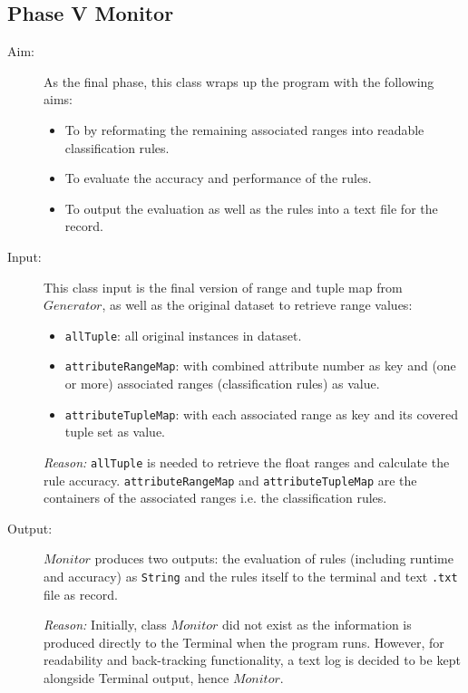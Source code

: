 \begin{description}
\end{description}


\subsection{Phase V Monitor}
\begin{description}

\item[Aim: ] As the final phase, this class wraps up the program with the following aims:

\begin{itemize}
	\item{To by reformating the remaining associated ranges into readable classification rules.} 
	\item{To evaluate the accuracy and performance of the rules.} 
	\item{To output the evaluation as well as the rules into a text file for the record.} 
\end{itemize}

\item[Input: ] This class input is the final version of range and tuple map from $Generator$, as well as the original dataset to retrieve range values:
\begin{itemize}
	\item{\texttt{allTuple}:  all original instances in dataset.} 
	\item{\texttt{attributeRangeMap}: with combined attribute number as key and (one or more) associated ranges (classification rules) as value.}
	\item{\texttt{attributeTupleMap}: with each associated range as key and its covered tuple set as value.}
\end{itemize}

\textit{Reason: } \texttt{allTuple} is needed to retrieve the float ranges and calculate the rule accuracy. \texttt{attributeRangeMap} and \texttt{attributeTupleMap} are the containers of the associated ranges i.e. the classification rules.

\item[Output: ] $Monitor$ produces two outputs: the evaluation of rules (including runtime and accuracy) as \texttt{String} and the rules itself to the terminal and text \texttt{.txt} file as record. 
  
\textit{Reason: } Initially, class $Monitor$ did not exist as the information is produced directly to the Terminal when the program runs. However, for readability and back-tracking functionality, a text log is decided to be kept alongside Terminal output, hence $Monitor$.  


\end{description}
